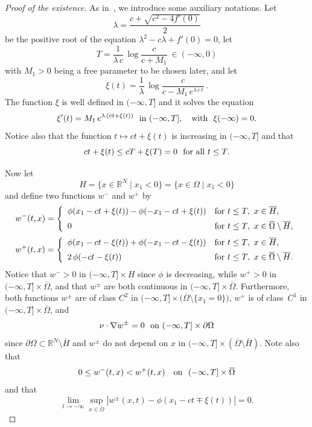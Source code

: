 \documentclass[a4paper,12pt,fullpage]{article}
\numberwithin{equation}{section}
\def\R{{\mathbb R}}
\begin{document}
\begin{proof}[Proof of the existence] 
As in~\cite{BHM1}, we introduce some auxiliary notations. Let
\[
\lambda=\frac{c+\sqrt{c^2-4f'(0)}}{2}
\]
be the positive root of the equation $\lambda^2-c\lambda+f'(0)=0$, let
\[
T=\frac{1}{\lambda\,c}\,\log\frac{c}{c+M_1}\ \in(-\infty,0)
\]
with $M_1>0$ being a free parameter to be chosen later, and let
\[
\xi(t)=\frac{1}{\lambda}\,\log\frac{c}{c-M_1\,e^{\lambda\, c\,t}}\,.
\]
The function $\xi$ is well defined in $(-\infty,T]$ and it solves the equation
\[
\xi'(t)=M_1\,e^{\lambda\,(ct+\xi(t))}\ \hbox{ in }(-\infty,T],\quad\hbox{with}\ \ \xi(-\infty)=0.
\]
Notice also that the function $t\mapsto ct+\xi(t)$ is increasing in $(-\infty,T]$ and that
\[
ct+\xi(t)\le cT+\xi(T)=0\ \hbox{ for all }t\le T.\]

Now let 
\[
H=\big\{x\in\R^N \mid x_1<0\big\}=\big\{x\in\Omega \mid x_1<0\big\}
\]
and define two functions $w^-$ and $w^+$ by
\begin{equation*}%
w^-(t,x)=\left\{
\begin{array}{ll}\vspace{5pt}
\phi(x_1-ct+\xi(t))-\phi(-x_1-ct+\xi(t)) & \hbox{for }t\le T,\ x\in\overline{H},\\
0 & \hbox{for }t\le T,\ x\in\overline{\Omega}\setminus\overline{H},
\end{array}\right.
\end{equation*}
\begin{equation*}%
w^+(t,x)=\left\{
\begin{array}{ll}\vspace{5pt}
\phi(x_1-ct-\xi(t))+\phi(-x_1-ct-\xi(t)) & \hbox{for }t\le T,\ x\in\overline{H},\\
2\,\phi(-ct-\xi(t)) & \hbox{for }t\le T,\ x\in\overline{\Omega}\setminus\overline{H}.
\end{array}\right.
\end{equation*}
Notice that $w^->0$ in $(-\infty,T]\times H$ since $\phi$ is decreasing, while $w^+>0$ in $(-\infty,T]\times\overline{\Omega}$, and that $w^{\pm}$ are both continuous in $(-\infty,T]\times\overline{\Omega}$. Furthermore, both functions $w^\pm$ are of class $C^2$ in $(-\infty,T]\times\big(\overline{\Omega}\!\setminus\!\{x_1=0\}\big)$, $w^+$ is of class~$C^1$ in $(-\infty,T]\times\overline{\Omega}$, and
\begin{equation}\label{w-Neumann}
\nu\cdot\nabla w^{\pm}=0\ \hbox{ on }(-\infty,T]\times\partial\Omega
\end{equation}
since $\partial\Omega\subset\R^N\!\setminus\!\overline{H}$ and $w^{\pm}$ do not depend on $x$ in $(-\infty,T]\times(\overline{\Omega}\!\setminus\!\overline{H})$. Note also that
\begin{equation}\label{w-<w+}
0\leq w^-(t,x)<w^+(t,x) \quad \hbox{on}\ \  (-\infty,T]\times\overline{\Omega} 
\end{equation}
and that
\begin{equation}\label{w-phi}
\lim_{t\to-\infty}\sup_{x\in \overline{\Omega}}|w^\pm(x,t)-\phi(x_1-ct\mp\xi(t))|=0.
\end{equation}


\end{proof}
\end{document}
